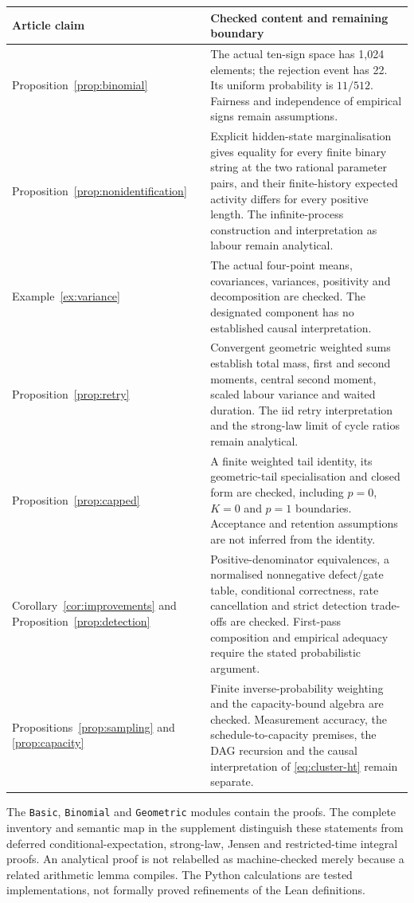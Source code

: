\documentclass[11pt,a4paper]{amsart}
\theoremstyle{definition}
\theoremstyle{remark}
\begin{document}
\begin{center}
\small
\begin{tabularx}{\linewidth}{@{}p{.27\linewidth}X@{}}
\toprule
Article claim & Checked content and remaining boundary\\
\midrule
Proposition~\ref{prop:binomial} & The actual ten-sign space has 1,024 elements; the rejection event has 22. Its uniform probability is $11/512$. Fairness and independence of empirical signs remain assumptions.\\
Proposition~\ref{prop:nonidentification} & Explicit hidden-state marginalisation gives equality for every finite binary string at the two rational parameter pairs, and their finite-history expected activity differs for every positive length. The infinite-process construction and interpretation as labour remain analytical.\\
Example~\ref{ex:variance} & The actual four-point means, covariances, variances, positivity and decomposition are checked. The designated component has no established causal interpretation.\\
Proposition~\ref{prop:retry} & Convergent geometric weighted sums establish total mass, first and second moments, central second moment, scaled labour variance and waited duration. The iid retry interpretation and the strong-law limit of cycle ratios remain analytical.\\
Proposition~\ref{prop:capped} & A finite weighted tail identity, its geometric-tail specialisation and closed form are checked, including $p=0$, $K=0$ and $p=1$ boundaries. Acceptance and retention assumptions are not inferred from the identity.\\
Corollary~\ref{cor:improvements} and Proposition~\ref{prop:detection} & Positive-denominator equivalences, a normalised nonnegative defect/gate table, conditional correctness, rate cancellation and strict detection trade-offs are checked. First-pass composition and empirical adequacy require the stated probabilistic argument.\\
Propositions~\ref{prop:sampling} and \ref{prop:capacity} & Finite inverse-probability weighting and the capacity-bound algebra are checked. Measurement accuracy, the schedule-to-capacity premises, the DAG recursion and the causal interpretation of \eqref{eq:cluster-ht} remain separate.\\
\bottomrule
\end{tabularx}
\end{center}

The \texttt{Basic}, \texttt{Binomial} and \texttt{Geometric} modules contain the proofs. The complete inventory and semantic map in the supplement distinguish these statements from deferred conditional-expectation, strong-law, Jensen and restricted-time integral proofs. An analytical proof is not relabelled as machine-checked merely because a related arithmetic lemma compiles. The Python calculations are tested implementations, not formally proved refinements of the Lean definitions.
\end{document}
